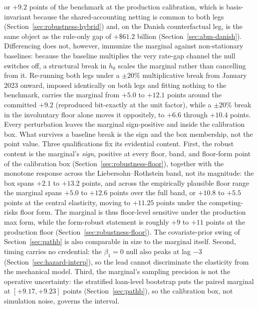 \documentclass[12pt]{article}
\begin{document}
or $+9.2$ points of the benchmark at the production calibration, which is basis-invariant because the shared-accounting netting is common to both legs (Section~\ref{sec:robustness-hybrid}) and, on the Danish counterfactual leg, is the same object as the rule-only gap of $+\$61.2$ billion (Section~\ref{sec:abm-danish}). Differencing does not, however, immunize the marginal against non-stationary baselines: because the baseline multiplies the very rate-gap channel the null switches off, a structural break in $h_0$ scales the marginal rather than cancelling from it. Re-running both legs under a $\pm 20\%$ multiplicative break from January 2023 onward, imposed identically on both legs and fitting nothing to the benchmark, carries the marginal from $+5.0$ to $+12.1$ points around the committed $+9.2$ (reproduced bit-exactly at the unit factor), while a $\pm 20\%$ break in the involuntary floor alone moves it oppositely, to $+6.6$ through $+10.4$ points. Every perturbation leaves the marginal sign-positive and inside the calibration box. What survives a baseline break is the sign and the box membership, not the point value. Three qualifications fix its evidential content. First, the robust content is the marginal's \emph{sign}, positive at every floor, band, and floor-form point of the calibration box (Section~\ref{sec:robustness-floor}), together with the monotone response across the Liebersohn--Rothstein band, not its magnitude: the box spans $+2.1$ to $+13.2$ points, and across the empirically plausible floor range the marginal spans $+5.0$ to $+12.6$ points over the full band, or $+10.8$ to $+5.5$ points at the central elasticity, moving to $+11.25$ points under the competing-risks floor form. The marginal is thus floor-level sensitive under the production max form, while the form-robust statement is roughly $+9$ to $+11$ points at the production floor (Section~\ref{sec:robustness-floor}). The covariate-prior swing of Section~\ref{sec:pathb} is also comparable in size to the marginal itself. Second, timing carries no credential: the $\beta_1 = 0$ null also peaks at lag $-3$ (Section~\ref{sec:hazard-interp}), so the lead cannot discriminate the elasticity from the mechanical model. Third, the marginal's sampling precision is not the operative uncertainty: the stratified loan-level bootstrap puts the paired marginal at $[+9.17, +9.23]$ points (Section~\ref{sec:pathb}), so the calibration box, not simulation noise, governs the interval.
\end{document}
